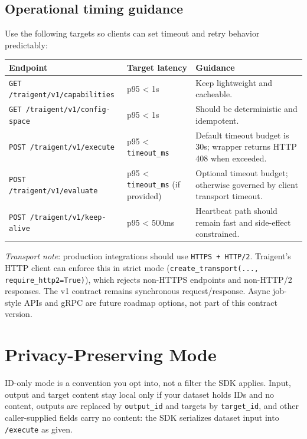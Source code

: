 \documentclass[11pt,a4paper]{article}
\newcommand{\field}[1]{\texttt{#1}}
\begin{document}
\subsection{Operational timing guidance}

Use the following targets so clients can set timeout and retry behavior predictably:

\begin{center}\small
\begin{tabularx}{\textwidth}{@{}llX@{}}
\toprule
\textbf{Endpoint} & \textbf{Target latency} & \textbf{Guidance} \\
\midrule
\texttt{GET /traigent/v1/capabilities} & p95 \textless{} 1s & Keep lightweight and cacheable. \\
\texttt{GET /traigent/v1/config-space} & p95 \textless{} 1s & Should be deterministic and idempotent. \\
\texttt{POST /traigent/v1/execute} & p95 \textless{} \field{timeout\_ms} & Default timeout budget is 30s; wrapper returns HTTP 408 when exceeded. \\
\texttt{POST /traigent/v1/evaluate} & p95 \textless{} \field{timeout\_ms} (if provided) & Optional timeout budget; otherwise governed by client transport timeout. \\
\texttt{POST /traigent/v1/keep-alive} & p95 \textless{} 500ms & Heartbeat path should remain fast and side-effect constrained. \\
\bottomrule
\end{tabularx}
\end{center}

\textit{Transport note}: production integrations should use \texttt{HTTPS + HTTP/2}.
Traigent's HTTP client can enforce this in strict mode
(\texttt{create\_transport(..., require\_http2=True)}), which rejects non-HTTPS
endpoints and non-HTTP/2 responses. The v1 contract remains synchronous
request/response. Async job-style APIs and gRPC are future roadmap options, not
part of this contract version.

\section{Privacy-Preserving Mode}\label{sec:privacy}

ID-only mode is a convention you opt into, not a filter the SDK applies.
Input, output and target content stay local only if your dataset holds IDs and
no content, outputs are replaced by \field{output\_id} and targets by
\field{target\_id}, and other caller-supplied fields carry no content: the SDK
serializes dataset input into \texttt{/execute} as given.
\end{document}
